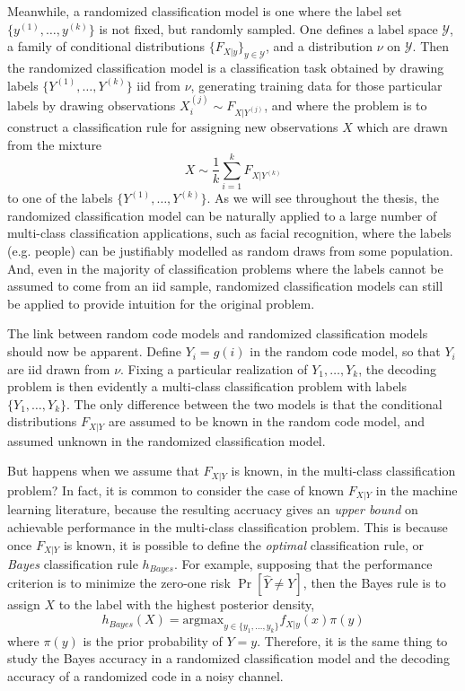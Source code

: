 Meanwhile, a randomized classification model is one where the label
set $\{y^{(1)},\hdots, y^{(k)}\}$ is not fixed, but randomly sampled.
One defines a label space $\mathcal{Y}$, a family of conditional
distributions $\{F_{X|y}\}_{y \in \mathcal{Y}}$, and a distribution
$\nu$ on $\mathcal{Y}$.  Then the randomized classification model is a
classification task obtained by drawing labels $\{Y^{(1)},\hdots,
Y^{(k)}\}$ iid from $\nu$, generating training data for those
particular labels by drawing observations $X_i^{(j)} \sim
F_{X|Y^{(j)}}$, and where the problem is to construct a classification
rule for assigning new observations $X$ which are drawn from the
mixture
\[
X \sim \frac{1}{k}\sum_{i=1}^k F_{X|Y^{(k)}}
\]
to one of the labels $\{Y^{(1)},\hdots, Y^{(k)}\}.$ As we will see
throughout the thesis, the randomized classification model can be
naturally applied to a large number of multi-class classification
applications, such as facial recognition, where the labels
(e.g. people) can be justifiably modelled as random draws from some
population.  And, even in the majority of classification problems
where the labels cannot be assumed to come from an iid sample,
randomized classification models can still be applied to provide
intuition for the original problem.

The link between random code models and randomized classification
models should now be apparent. Define $Y_i = g(i)$ in the random code
model, so that $Y_i$ are iid drawn from $\nu$.  Fixing a particular
realization of $Y_1,\hdots, Y_k$, the decoding problem is then
evidently a multi-class classification problem with labels
$\{Y_1,\hdots, Y_k\}$.  The only difference between the two models is
that the conditional distributions $F_{X|Y}$ are assumed to be known
in the random code model, and assumed unknown in the randomized
classification model.

But happens when we assume that $F_{X|Y}$ is known, in the multi-class
classification problem?  In fact, it is common to consider the case of
known $F_{X|Y}$ in the machine learning literature, because the
resulting accruacy gives an \emph{upper bound} on achievable
performance in the multi-class classification problem.  This is
because once $F_{X|Y}$ is known, it is possible to define the
\emph{optimal} classification rule, or \emph{Bayes} classification
rule $h_{Bayes}$.  For example, supposing that the performance
criterion is to minimize the zero-one risk $\Pr[\hat{Y} \neq Y]$, then
the Bayes rule is to assign $X$ to the label with the highest
posterior density,
\[
h_{Bayes}(X) = \text{argmax}_{y \in \{y_1, \hdots, y_k\}} f_{X|y}(x) \pi(y)
\]
where $\pi(y)$ is the prior probability of $Y = y$.  Therefore, it is
the same thing to study the Bayes accuracy in a randomized
classification model and the decoding accuracy of a randomized code in
a noisy channel.

